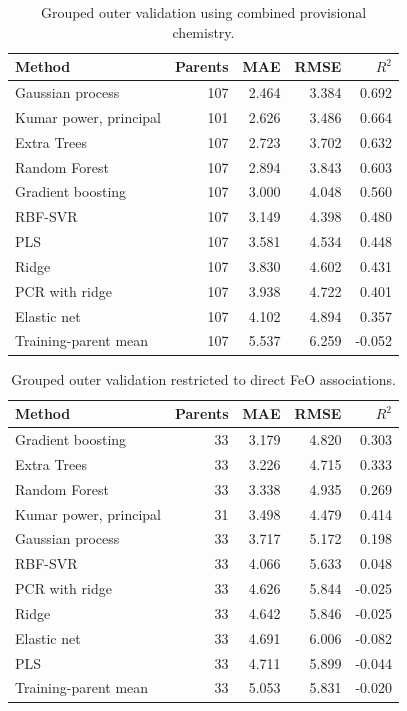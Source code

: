 \documentclass[11pt]{article}
\begin{document}
\begin{table}[H]
\centering
\caption{Grouped outer validation using combined provisional chemistry.}
\begin{tabular}{lrrrr}
\toprule Method & Parents & MAE & RMSE & $R^2$\\ \midrule
Gaussian process & 107 & 2.464 & 3.384 & 0.692\\
Kumar power, principal & 101 & 2.626 & 3.486 & 0.664\\
Extra Trees & 107 & 2.723 & 3.702 & 0.632\\
Random Forest & 107 & 2.894 & 3.843 & 0.603\\
Gradient boosting & 107 & 3.000 & 4.048 & 0.560\\
RBF-SVR & 107 & 3.149 & 4.398 & 0.480\\
PLS & 107 & 3.581 & 4.534 & 0.448\\
Ridge & 107 & 3.830 & 4.602 & 0.431\\
PCR with ridge & 107 & 3.938 & 4.722 & 0.401\\
Elastic net & 107 & 4.102 & 4.894 & 0.357\\
Training-parent mean & 107 & 5.537 & 6.259 & -0.052\\ \bottomrule
\end{tabular}
\end{table}

\begin{table}[H]
\centering
\caption{Grouped outer validation restricted to direct FeO associations.}
\begin{tabular}{lrrrr}
\toprule Method & Parents & MAE & RMSE & $R^2$\\ \midrule
Gradient boosting & 33 & 3.179 & 4.820 & 0.303\\
Extra Trees & 33 & 3.226 & 4.715 & 0.333\\
Random Forest & 33 & 3.338 & 4.935 & 0.269\\
Kumar power, principal & 31 & 3.498 & 4.479 & 0.414\\
Gaussian process & 33 & 3.717 & 5.172 & 0.198\\
RBF-SVR & 33 & 4.066 & 5.633 & 0.048\\
PCR with ridge & 33 & 4.626 & 5.844 & -0.025\\
Ridge & 33 & 4.642 & 5.846 & -0.025\\
Elastic net & 33 & 4.691 & 6.006 & -0.082\\
PLS & 33 & 4.711 & 5.899 & -0.044\\
Training-parent mean & 33 & 5.053 & 5.831 & -0.020\\ \bottomrule
\end{tabular}
\end{table}
\end{document}
